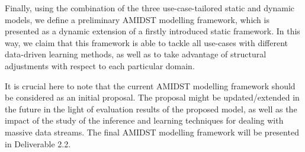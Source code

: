 Finally, using the combination of the three use-case-tailored static and dynamic models, we define a preliminary AMIDST modelling framework, which is presented as a dynamic extension of a firstly introduced static framework. In this way, we claim that this framework is able to tackle all use-cases with different data-driven learning methods, as well as to take advantage of structural adjustments with respect to each particular domain.

It is crucial here to note that the current AMIDST modelling framework should be considered as an initial proposal. The proposal might be updated/extended in the future in the light of evaluation results of the proposed model, as well as the impact of the study of the inference and learning techniques for dealing with massive data streams. The final AMIDST modelling framework will be presented in Deliverable 2.2.


